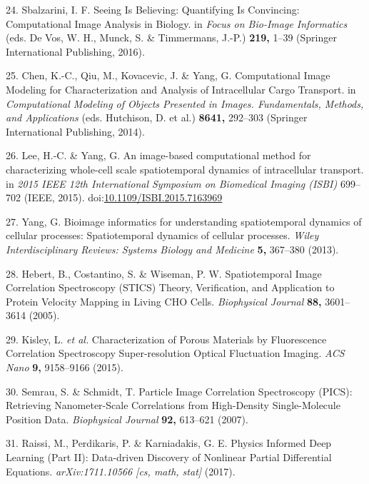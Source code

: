 \documentclass{Dissertate}
\begin{document}
\leavevmode\hypertarget{ref-de_vos_seeing_2016}{}%
24. Sbalzarini, I. F. Seeing Is Believing: Quantifying Is Convincing:
Computational Image Analysis in Biology. in \emph{Focus on Bio-Image
Informatics} (eds. De Vos, W. H., Munck, S. \& Timmermans, J.-P.)
\textbf{219,} 1--39 (Springer International Publishing, 2016).

\leavevmode\hypertarget{ref-hutchison_computational_2014}{}%
25. Chen, K.-C., Qiu, M., Kovacevic, J. \& Yang, G. Computational Image
Modeling for Characterization and Analysis of Intracellular Cargo
Transport. in \emph{Computational Modeling of Objects Presented in
Images. Fundamentals, Methods, and Applications} (eds. Hutchison, D. et
al.) \textbf{8641,} 292--303 (Springer International Publishing, 2014).

\leavevmode\hypertarget{ref-lee_image-based_2015}{}%
26. Lee, H.-C. \& Yang, G. An image-based computational method for
characterizing whole-cell scale spatiotemporal dynamics of intracellular
transport. in \emph{2015 IEEE 12th International Symposium on Biomedical
Imaging (ISBI)} 699--702 (IEEE, 2015).
doi:\href{https://doi.org/10.1109/ISBI.2015.7163969}{10.1109/ISBI.2015.7163969}

\leavevmode\hypertarget{ref-yang_bioimage_2013}{}%
27. Yang, G. Bioimage informatics for understanding spatiotemporal
dynamics of cellular processes: Spatiotemporal dynamics of cellular
processes. \emph{Wiley Interdisciplinary Reviews: Systems Biology and
Medicine} \textbf{5,} 367--380 (2013).

\leavevmode\hypertarget{ref-hebert_spatiotemporal_2005}{}%
28. Hebert, B., Costantino, S. \& Wiseman, P. W. Spatiotemporal Image
Correlation Spectroscopy (STICS) Theory, Verification, and Application
to Protein Velocity Mapping in Living CHO Cells. \emph{Biophysical
Journal} \textbf{88,} 3601--3614 (2005).

\leavevmode\hypertarget{ref-kisley_characterization_2015}{}%
29. Kisley, L. \emph{et al.} Characterization of Porous Materials by
Fluorescence Correlation Spectroscopy Super-resolution Optical
Fluctuation Imaging. \emph{ACS Nano} \textbf{9,} 9158--9166 (2015).

\leavevmode\hypertarget{ref-semrau_particle_2007}{}%
30. Semrau, S. \& Schmidt, T. Particle Image Correlation Spectroscopy
(PICS): Retrieving Nanometer-Scale Correlations from High-Density
Single-Molecule Position Data. \emph{Biophysical Journal} \textbf{92,}
613--621 (2007).

\leavevmode\hypertarget{ref-raissi_physics_2017}{}%
31. Raissi, M., Perdikaris, P. \& Karniadakis, G. E. Physics Informed
Deep Learning (Part II): Data-driven Discovery of Nonlinear Partial
Differential Equations. \emph{arXiv:1711.10566 {[}cs, math, stat{]}}
(2017).
\end{document}
